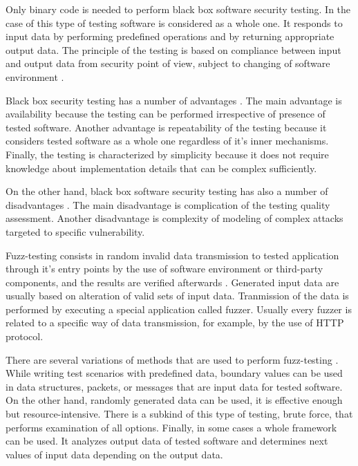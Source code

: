 %
Only binary code is needed to perform black box software security testing. 
%
In the case of this type of testing software is considered as a whole one. 
%
It responds to input data by performing predefined operations and by returning appropriate output data. 
%
The principle of the testing is based on compliance between input and output data from \The security point of view, subject to changing of software environment . 

%
Black box security testing has a number of advantages . 
%
The main advantage is availability because the testing can be performed irrespective of presence of tested software. 
%
Another advantage is repeatability of the testing because it considers tested software as a whole one regardless of it's inner mechanisms. 
%
Finally, the testing is characterized by simplicity because it does not require knowledge about implementation details that can be complex sufficiently. 

%
On the other hand, black box software security testing has also a number of disadvantages . 
%
The main disadvantage is complication of the testing quality assessment. 
%
Another disadvantage is complexity of modeling of complex attacks targeted to \A specific vulnerability. 



%
Fuzz-testing consists in random invalid data transmission to \A tested application through it's entry points by the use of software environment or third-party components, and the results are verified afterwards . 
%
Generated input data are usually based on alteration of valid sets of input data. 
%
Tranmission of the data is performed by executing a special application called fuzzer. 
%
Usually every fuzzer is related to a specific way of data transmission, for example, by the use of HTTP protocol. 

%
There are several variations of methods that are used to perform fuzz-testing . 
%
While writing test scenarios with predefined data, boundary values can be used in data structures, packets, or messages that are input data for tested software. 
%
On the other hand, randomly generated data can be used, it is effective enough but resource-intensive. 
%
There is a subkind of this type of testing, brute force, that performs examination of all options. 
%
Finally, in some cases a whole framework can be used. 
%
It analyzes output data of tested software and determines next values of input data depending on the output data. 

